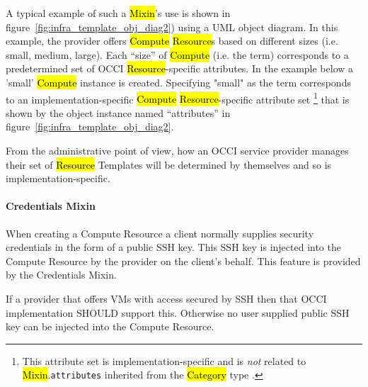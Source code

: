 \documentclass[10pt,a4paper]{article}
\begin{document}

A typical example of such a \hl{Mixin}'s use is shown in
figure~\ref{fig:infra_template_obj_diag2}) using a UML object diagram.
In this example, the provider offers \hl{Compute} \hl{Resource}s based
on different sizes (i.e. small, medium, large). Each ``size'' of
\hl{Compute} (i.e. the term) corresponds to a predetermined set of
OCCI \hl{Resource}-specific attributes. In the example below a 'small'
\hl{Compute} instance is created.  Specifying "small" as the term
corresponds to an implementation-specific \hl{Compute}
\hl{Resource}-specific attribute set%
\footnote{This attribute set is implementation-specific and is {\em
    not} related to \hl{Mixin}.{\tt attributes} inherited from the
  \hl{Category} type \cite{occi:core}.}  that is shown by the object
instance named ``attributes'' in
figure~\ref{fig:infra_template_obj_diag2}.


From the administrative point of view, how an OCCI service provider
manages their set of \hl{Resource} Templates will be determined by
themselves and so is implementation-specific.

\paragraph{Credentials Mixin}


When creating a Compute Resource a client normally supplies security credentials in the form of a public SSH key. This SSH key is injected into the Compute Resource by the provider on the client's behalf. This feature is provided by the Credentials Mixin.

If a provider that offers VMs with access secured by SSH then that OCCI implementation SHOULD support this. Otherwise no user supplied public SSH key can be injected into the Compute Resource.
\end{document}
